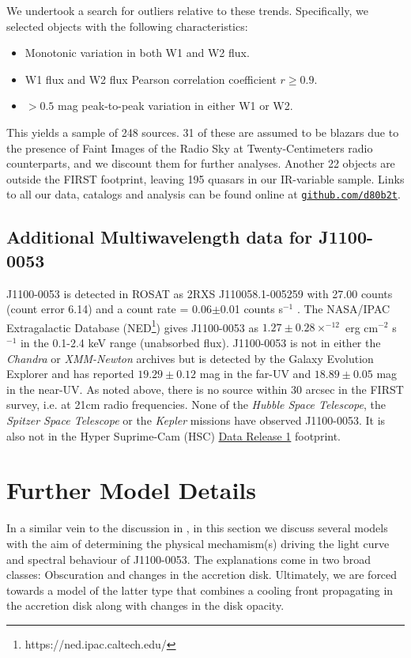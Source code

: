 \documentclass[11pt,a4paper]{article}
\begin{document}
We undertook a search for outliers relative to these
trends. Specifically, we selected objects with the following
characteristics:
\begin{itemize}
    \item Monotonic variation in both W1 and W2 flux.
    \item W1 flux and W2 flux Pearson correlation coefficient $r \geq0.9$.
    \item $>0.5$ mag peak-to-peak variation in either W1 or W2.
\end{itemize}
This yields a sample of 248 sources. 31 of these are assumed to be
blazars due to the presence of Faint Images of the Radio Sky at
Twenty-Centimeters \citep[FIRST; ][]{Becker1995} radio counterparts,
and we discount them for further analyses. Another 22 objects are
outside the FIRST footprint, leaving 195 quasars in our IR-variable
sample. Links to all our data, catalogs and analysis can be found
online at \href{https://github.com/d80b2t}{{\tt github.com/d80b2t}}.


\subsection{Additional Multiwavelength data for J1100-0053}
J1100-0053 is detected in ROSAT as 2RXS J110058.1-005259 with 27.00
counts (count error 6.14) and a count rate = 0.06$\pm$0.01 counts
s$^{-1}$ \cite{Boller2016}. The NASA/IPAC Extragalactic Database
(NED\footnote{https://ned.ipac.caltech.edu/}) gives J1100-0053 as
$1.27\pm0.28 \times^{-12}$ erg cm$^{-2}$ s$^{-1}$ in the 0.1-2.4 keV
range (unabsorbed flux). J1100-0053 is not in either the {\it Chandra}
or {\it XMM-Newton} archives but is detected by the Galaxy Evolution
Explorer \citep[GALEX; ][]{Martin2005, Morrissey2007} and has reported
$19.29\pm0.12$ mag in the far-UV and $18.89\pm0.05$ mag in the
near-UV. As noted above, there is no source within 30 arcsec in the
FIRST survey, i.e. at 21cm radio frequencies. None of the {\it Hubble
Space Telescope}, the {\it Spitzer Space Telescope} or the {\it
Kepler} missions have observed J1100-0053.  It is also not in the
Hyper Suprime-Cam (HSC)
\href{https://hsc-release.mtk.nao.ac.jp/doc/}{Data Release 1}
\citep{Aihara2017} footprint.


\section{Further Model Details}
In a similar vein to the discussion in \cite{Stern2018}, in this
section we discuss several models with the aim of determining the
physical mechamism(s) driving the light curve and spectral behaviour
of J1100-0053. The explanations come in two broad classes: Obscuration
and changes in the accretion disk.  Ultimately, we are forced towards a
model of the latter type that combines a cooling front propagating in
the accretion disk along with changes in the disk opacity.
\end{document}
